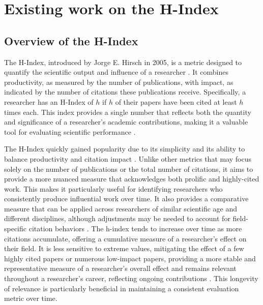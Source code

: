 \chapter{Existing work on the H-Index}
\label{ch:background}

\section{Overview of the H-Index}
The H-Index, introduced by Jorge E. Hirsch in 2005, is a metric designed to
quantify the scientific output and influence of a researcher
\cite{hirsch2005index,hirsch2014meaning,koltun2021h}. It combines productivity,
as measured by the number of publications, with impact, as indicated by the
number of citations these publications receive. Specifically, a researcher has
an H-Index of $h$ if $h$ of their papers have been cited at least $h$ times
each. This index provides a single number that reflects both the quantity and
significance of a researcher’s academic contributions, making it a valuable
tool for evaluating scientific performance
\cite{hirsch2005index,hirsch2014meaning}.

The H-Index quickly gained popularity due to its simplicity and its ability to
balance productivity and citation impact
\cite{hirsch2005index,bornmann2007what,costas2007h,waltman2012inconsistency,hirsch2014meaning,koltun2021h}.
Unlike other metrics that may focus solely on the number of publications or the
total number of citations, it aims to provide a more nuanced measure that
acknowledges both prolific and highly-cited work. This makes it particularly
useful for identifying researchers who consistently produce influential work
over time. It also provides a comparative measure that can be applied across
researchers of similar scientific age and different disciplines, although
adjustments may be needed to account for field-specific citation behaviors
\cite{hirsch2005index,bornmann2007what,costas2007h,egghe2010hirsch}. The
h-index tends to increase over time as more citations accumulate, offering a
cumulative measure of a researcher’s effect on their field. It is less
sensitive to extreme values, mitigating the effect of a few highly cited papers
or numerous low-impact papers, providing a more stable and representative
measure of a researcher's overall effect and remains relevant throughout a
researcher's career, reflecting ongoing contributions
\cite{hirsch2005index,costas2007h,waltman2012inconsistency,egghe2010hirsch}.
This longevity of relevance is particularly beneficial in maintaining a
consistent evaluation metric over time.

